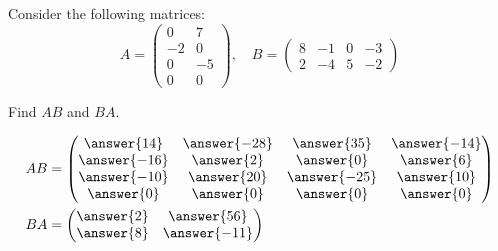 \documentclass{ximera}
\author{Parisa Fatheddin}
\begin{document}
\begin{exercise}

  Consider the following matrices:
  \[
    A =
    \begin{pmatrix}
      0 & 7\\
      -2 & 0\\
      0 & -5 \\
      0 & 0
    \end{pmatrix}, \quad
    B =
    \begin{pmatrix}
      8 & -1 & 0 & -3\\
      2 & -4 & 5 & -2
    \end{pmatrix}
  \]

  Find $AB$ and $BA$.

  \begin{prompt}
    \begin{align*}
      AB
      & =
        \begin{pmatrix}
          \answer{14} & \answer{-28} & \answer{35} & \answer{-14}\\
          \answer{-16} & \answer{2} & \answer{0} & \answer{6}\\
          \answer{-10} & \answer{20} & \answer{-25} & \answer{10}\\
          \answer{0} & \answer{0} & \answer{0} & \answer{0}
        \end{pmatrix} \\
      BA
      & =
        \begin{pmatrix}
          \answer{2} & \answer{56}\\
          \answer{8} & \answer{-11}
        \end{pmatrix}
    \end{align*}
  \end{prompt}

\end{exercise}
\end{document}
